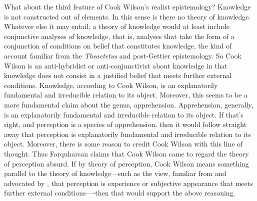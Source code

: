 \documentclass[12pt]{article}
\begin{document}
What about the third feature of Cook Wilson's realist epistemology? Knowledge is not constructed out of elements. In this sense is there no theory of knowledge. Whatever else it may entail, a theory of knowledge would at least include conjunctive analyses of knowledge, that is, analyses that take the form of a conjunction of conditions on belief that constitutes knowledge, the kind of account familiar from the \emph{Theaetetus} and post-Gettier epistemology. So Cook Wilson is an anti-hybridist or anti-conjunctivist about knowledge in that knowledge does not consist in a justified belief that meets further external conditions. Knowledge, according to Cook Wilson, is an explanatorily fundamental and irreducible relation to its object. Moreover, this seems to be a more fundamental claim about the genus, apprehension. Apprehension, generally, is an explanatorily fundamental and irreducible relation to its object. If that's right, and perception is a species of apprehension, then it would follow straight away that perception is explanatorily fundamental and irreducible relation to its object. Moreover, there is some reason to credit Cook Wilson with this line of thought. Thus Farquharsan claims that Cook Wilson came to regard the theory of perception absurd. If by theory of perception, Cook Wilson means something parallel to the theory of knowledge---such as the view, familiar from \citet{Grice:1962jw} and advocated by \citet{Hobbes:1651fk}, that perception is experience or subjective appearance that meets further external conditions----then that would support the above reasoning. 
\end{document}
